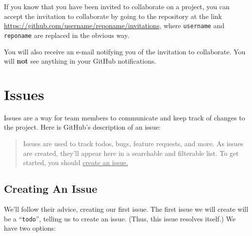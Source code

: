 \documentclass[11pt]{article}
\begin{document}
If you know that you have been invited to collaborate on a project, you can accept the invitation to collaborate by going to the repository at the link \url{https://github.com/username/reponame/invitations}, where \texttt{username} and \texttt{reponame} are replaced in the obvious way. 

You will also receive an e-mail notifying you of the invitation to collaborate. You will \textbf{not} see anything in your GitHub notifications. 

\hypertarget{issues-section}{\section{Issues}}

Issues are a way for team members to communicate and keep track of changes to the project.  Here is GitHub's description of an issue:~\cite{github-issues} \\

\begin{quote}
Issues are used to track todos, bugs, feature requests, and more. As issues are created, they'll appear here in a searchable and filterable list. To get started, you should \underline{create an issue.}
\end{quote} 

\subsection{Creating An Issue}
We'll follow their advice, creating our first issue. The first issue we will create will be a ``\texttt{todo}'', telling us to create an issue. (Thus, this issue resolves itself.) We have two options: 
\end{document}

